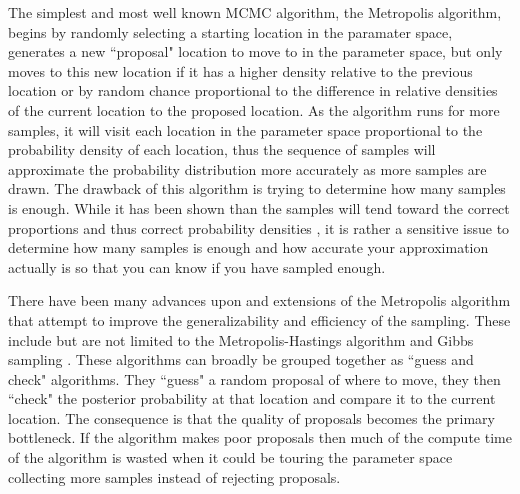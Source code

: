 The simplest and most well known MCMC algorithm, the Metropolis algorithm, begins by randomly selecting a starting location in the paramater space, generates a new ``proposal" location to move to in the parameter space, but only moves to this new location if it has a higher density relative to the previous location or by random chance proportional to the difference in relative densities of the current location to the proposed location. As the algorithm runs for more samples, it will visit each location in the parameter space proportional to the probability density of each location, thus the sequence of samples will approximate the probability distribution more accurately as more samples are drawn. The drawback of this algorithm is trying to determine how many samples is enough. While it has been shown than the samples will tend toward the correct proportions and thus correct probability densities \cite{Metropolis1953} \cite{Hastings1970}, it is rather a sensitive issue to determine how many samples is enough and how accurate your approximation actually is so that you can know if you have sampled enough.

There have been many advances upon and extensions of the Metropolis algorithm that attempt to improve the generalizability and efficiency of the sampling. These include but are not limited to the Metropolis-Hastings algorithm and Gibbs sampling \cite{Hastings1970} \cite{German1984}. These algorithms can broadly be grouped together as ``guess and check" algorithms. They ``guess" a random proposal of where to move, they then ``check" the posterior probability at that location and compare it to the current location. The consequence is that the quality of proposals becomes the primary bottleneck. If the algorithm makes poor proposals then much of the compute time of the algorithm is wasted when it could be touring the parameter space collecting more samples instead of rejecting proposals.

